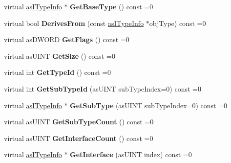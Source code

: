 \begin{DoxyCompactItemize}
\item 
\mbox{\label{classas_i_type_info_a8722ecc6b7e47491cdb6e442a3bf1ba2}} 
virtual \hyperlink{classas_i_type_info}{as\+I\+Type\+Info} $\ast$ {\bfseries Get\+Base\+Type} () const =0
\item 
\mbox{\label{classas_i_type_info_a4ce24b7a0ecd27bb7e34f1fa58c08d29}} 
virtual bool {\bfseries Derives\+From} (const \hyperlink{classas_i_type_info}{as\+I\+Type\+Info} $\ast$obj\+Type) const =0
\item 
\mbox{\label{classas_i_type_info_a068900ec359ff7fc2ee59a938ffe20ab}} 
virtual as\+D\+W\+O\+RD {\bfseries Get\+Flags} () const =0
\item 
\mbox{\label{classas_i_type_info_ad965398e393144e87c0436ef865b9b6d}} 
virtual as\+U\+I\+NT {\bfseries Get\+Size} () const =0
\item 
\mbox{\label{classas_i_type_info_a06698aa9dcc6dc315ec2651fc70dbe19}} 
virtual int {\bfseries Get\+Type\+Id} () const =0
\item 
\mbox{\label{classas_i_type_info_aa1a56809ce5c340364ecd8beac508eb4}} 
virtual int {\bfseries Get\+Sub\+Type\+Id} (as\+U\+I\+NT sub\+Type\+Index=0) const =0
\item 
\mbox{\label{classas_i_type_info_a8e947504f268c7f0e1c26973dd7d3837}} 
virtual \hyperlink{classas_i_type_info}{as\+I\+Type\+Info} $\ast$ {\bfseries Get\+Sub\+Type} (as\+U\+I\+NT sub\+Type\+Index=0) const =0
\item 
\mbox{\label{classas_i_type_info_a1657d5094afa550c93d8cc74c216c3c6}} 
virtual as\+U\+I\+NT {\bfseries Get\+Sub\+Type\+Count} () const =0
\item 
\mbox{\label{classas_i_type_info_a47a4bdc2462b38a5659c3cb96e61c649}} 
virtual as\+U\+I\+NT {\bfseries Get\+Interface\+Count} () const =0
\item 
\mbox{\label{classas_i_type_info_a320141f6c331a9e49334de2576c725f7}} 
virtual \hyperlink{classas_i_type_info}{as\+I\+Type\+Info} $\ast$ {\bfseries Get\+Interface} (as\+U\+I\+NT index) const =0

\end{DoxyCompactItemize}
